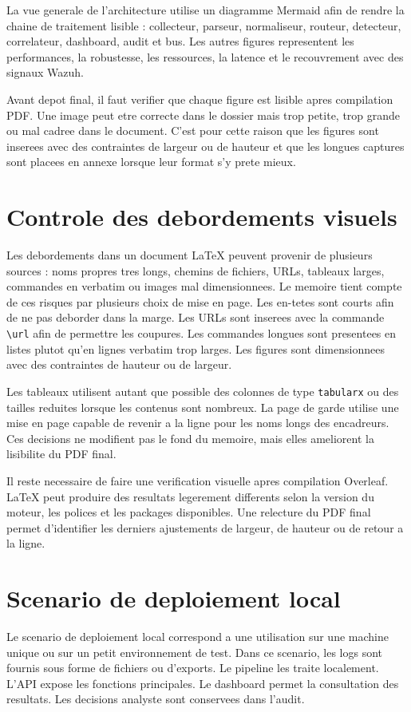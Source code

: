 La vue generale de l'architecture utilise un diagramme Mermaid afin de rendre la chaine de traitement lisible : collecteur, parseur, normaliseur, routeur, detecteur, correlateur, dashboard, audit et bus. Les autres figures representent les performances, la robustesse, les ressources, la latence et le recouvrement avec des signaux Wazuh.

Avant depot final, il faut verifier que chaque figure est lisible apres compilation PDF. Une image peut etre correcte dans le dossier mais trop petite, trop grande ou mal cadree dans le document. C'est pour cette raison que les figures sont inserees avec des contraintes de largeur ou de hauteur et que les longues captures sont placees en annexe lorsque leur format s'y prete mieux.

\section{Controle des debordements visuels}
Les debordements dans un document LaTeX peuvent provenir de plusieurs sources : noms propres tres longs, chemins de fichiers, URLs, tableaux larges, commandes en verbatim ou images mal dimensionnees. Le memoire tient compte de ces risques par plusieurs choix de mise en page. Les en-tetes sont courts afin de ne pas deborder dans la marge. Les URLs sont inserees avec la commande \verb|\url| afin de permettre les coupures. Les commandes longues sont presentees en listes plutot qu'en lignes verbatim trop larges. Les figures sont dimensionnees avec des contraintes de hauteur ou de largeur.

Les tableaux utilisent autant que possible des colonnes de type \texttt{tabularx} ou des tailles reduites lorsque les contenus sont nombreux. La page de garde utilise une mise en page capable de revenir a la ligne pour les noms longs des encadreurs. Ces decisions ne modifient pas le fond du memoire, mais elles ameliorent la lisibilite du PDF final.

Il reste necessaire de faire une verification visuelle apres compilation Overleaf. LaTeX peut produire des resultats legerement differents selon la version du moteur, les polices et les packages disponibles. Une relecture du PDF final permet d'identifier les derniers ajustements de largeur, de hauteur ou de retour a la ligne.

\section{Scenario de deploiement local}
Le scenario de deploiement local correspond a une utilisation sur une machine unique ou sur un petit environnement de test. Dans ce scenario, les logs sont fournis sous forme de fichiers ou d'exports. Le pipeline les traite localement. L'API expose les fonctions principales. Le dashboard permet la consultation des resultats. Les decisions analyste sont conservees dans l'audit.

